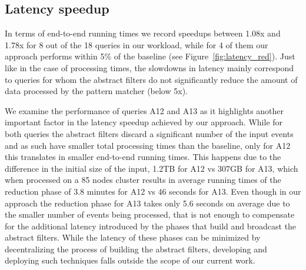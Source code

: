 \subsection{Latency speedup}


In terms of end-to-end running times we record speedups between 1.08x and 1.78x
for 8 out of the 18 queries in our workload, while for 4 of them our
approach performs within 5\% of the baseline (see Figure~\ref{fig:latency_red}).
Just like in the case of processing times, the slowdowns in latency mainly
correspond to queries for whom the abstract filters do not significantly reduce
the amount of data processed by the pattern matcher (below 5x).


We examine the performance of queries A12 and A13 as it highlights another
important factor in the latency speedup achieved by our approach.
While for both queries the abstract filters discard a significant number of the
input events and as such have smaller total processing times than the baseline,
only for A12 this translates in smaller end-to-end running times.
This happens due to the difference in the initial size of the input, 1.2TB for
A12 vs 307GB for A13, which when processed on a 85 nodes cluster results in
average running times of the reduction phase of 3.8 minutes for A12 vs 46
seconds for A13. 
Even though in our approach the reduction phase for A13 takes only 5.6 seconds
on average due to the smaller number of events being processed, that is not
enough to compensate for the additional latency introduced by the phases that
build and broadcast the abstract filters.
While the latency of these phases can be minimized by decentralizing the process
of building the abstract filters, developing and deploying such techniques falls 
outside the scope of our current work.

















